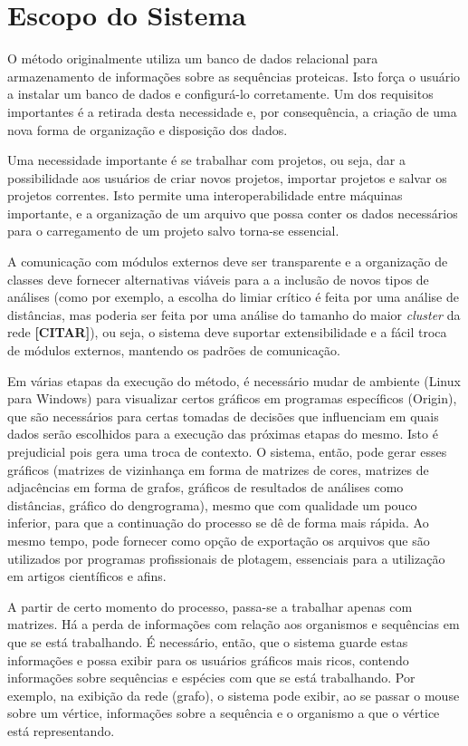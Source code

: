 \section{Escopo do Sistema} \label{sec:escopo}

O método originalmente utiliza um banco de dados relacional para armazenamento de informações sobre as sequências proteicas. Isto força o usuário a instalar
um banco de dados e configurá-lo corretamente. Um dos requisitos importantes é a retirada desta necessidade e, por consequência, a criação de uma nova forma
de organização e disposição dos dados.

Uma necessidade importante é se trabalhar com projetos, ou seja, dar a possibilidade aos usuários de criar novos projetos, importar projetos e salvar os
projetos correntes. Isto permite uma interoperabilidade entre máquinas importante, e a organização de um arquivo que possa conter os dados necessários
para o carregamento de um projeto salvo torna-se essencial.

A comunicação com módulos externos deve ser transparente e a organização de classes deve fornecer alternativas viáveis para a a inclusão de novos
tipos de análises (como por exemplo, a escolha do limiar crítico é feita por uma análise de distâncias, mas poderia ser feita por uma análise do tamanho
do maior \textit{cluster} da rede \textbf{[CITAR]}), ou seja, o sistema deve suportar extensibilidade e a fácil troca de módulos externos, mantendo
os padrões de comunicação.

Em várias etapas da execução do método, é necessário mudar de ambiente (Linux para Windows) para visualizar certos gráficos em programas específicos (Origin),
que são necessários para certas tomadas de decisões que influenciam em quais dados serão escolhidos para a execução das próximas etapas do mesmo. Isto é
prejudicial pois gera uma troca de contexto. O sistema, então, pode gerar esses gráficos (matrizes de vizinhança em forma de matrizes de cores, matrizes de
adjacências em forma de grafos, gráficos de resultados de análises como distâncias, gráfico do dengrograma), mesmo que com qualidade um pouco inferior,
para que a continuação do processo se dê de forma mais rápida. Ao mesmo tempo, pode fornecer como opção de exportação os arquivos que são utilizados por
programas profissionais de plotagem, essenciais para a utilização em artigos científicos e afins.

A partir de certo momento do processo, passa-se a trabalhar apenas com matrizes. Há a perda de informações com relação aos organismos e sequências em que se
está trabalhando. É necessário, então, que o sistema guarde estas informações e possa exibir para os usuários gráficos mais ricos, contendo informações sobre
sequências e espécies com que se está trabalhando. Por exemplo, na exibição da rede (grafo), o sistema pode exibir, ao se passar o mouse sobre um vértice,
informações sobre a sequência e o organismo a que o vértice está representando.

